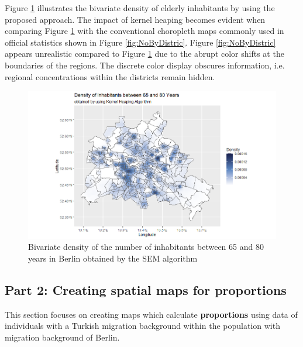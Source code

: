 Figure \ref{fig:BivDensity} illustrates the bivariate density of elderly inhabitants by using the proposed approach. 
The impact of kernel heaping becomes evident when comparing Figure \ref{fig:BivDensity} with the conventional choropleth maps commonly used in official statistics shown in Figure \ref{fig:NoByDistric}.
Figure \ref{fig:NoByDistric} appears unrealistic compared to Figure \ref{fig:BivDensity} due to the abrupt color shifts at the boundaries of the regions. The discrete color display obscures information, i.e. regional concentrations within the districts remain hidden.

\begin{figure}[h]
    \centering
    \includegraphics[scale = 0.55]{Figure/KH_Part1.png}
    \caption{Bivariate density of the number of inhabitants between 65 and 80 years in Berlin obtained by the SEM algorithm}
    \label{fig:BivDensity}
\end{figure}

\subsection{Part 2: Creating spatial maps for proportions}

This section focuses on creating maps which calculate \textbf{proportions} using data of individuals with a Turkish migration background within the population with migration background of Berlin. 

